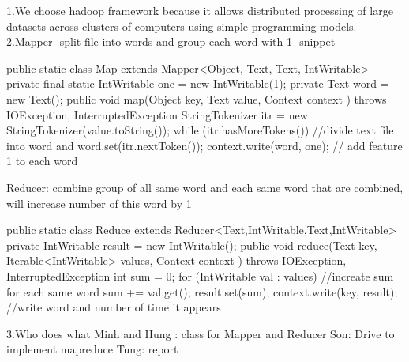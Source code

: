 1.We choose hadoop framework because it allows distributed processing of large datasets across clusters of computers using simple programming models.
2.Mapper
	-split file into words and group each word with 1
-snippet

public static class Map
       extends Mapper<Object, Text, Text, IntWritable>{
    private final static IntWritable one = new IntWritable(1);
    private Text word = new Text();
    public void map(Object key, Text value, Context context
                    ) throws IOException, InterruptedException {
      StringTokenizer itr = new StringTokenizer(value.toString());
      while (itr.hasMoreTokens()) {  //divide text file into word and 
        word.set(itr.nextToken());    
        context.write(word, one);    // add feature 1 to each word
      }
    }
  }

Reducer:
	combine group of all same word and each same word that are combined, will increase number of this word by 1

public static class Reduce
       extends Reducer<Text,IntWritable,Text,IntWritable> {
    private IntWritable result = new IntWritable();
    public void reduce(Text key, Iterable<IntWritable> values,
                       Context context
                       ) throws IOException, InterruptedException {
      int sum = 0;
      for (IntWritable val : values) {   //increate sum for each same word
        sum += val.get();              
      }
      result.set(sum);
      context.write(key, result);           //write word and number of time it appears
    }
  } 

3.Who does what
Minh and Hung : class for Mapper and Reducer
Son: Drive to implement mapreduce
Tung: report

